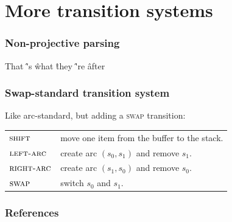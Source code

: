 \documentclass[t]{beamer}
\begin{document}
\section{More transition systems}

\begin{frame}
  \frametitle{Non-projective parsing}
  \begin{center}
    \begin{dependency}
      \begin{deptext}[column sep=1.5em,ampersand replacement=\^,font=\rmfamily]
        That \^ 's \^ what \^ they \^ 're \^ after \\
      \end{deptext}
    \end{dependency}
  \end{center}
\end{frame}

\begin{frame}
  \frametitle{Swap-standard transition system}
  Like arc-standard, but adding a \textsc{swap} transition:

  \begin{tabular}{ll}
    $\textsc{shift}$ & move one item from the buffer to the stack. \\
    $\textsc{left-arc}$ & create arc $(s_0, s_1)$ and remove $s_1$. \\
    $\textsc{right-arc}$ & create arc $(s_1, s_0)$ and remove $s_0$. \\
    $\textsc{swap}$ & switch $s_0$ and $s_1$.
  \end{tabular}
\end{frame}

\begin{frame}[allowframebreaks]
\frametitle{References}

\tiny
\end{frame}
\end{document}
